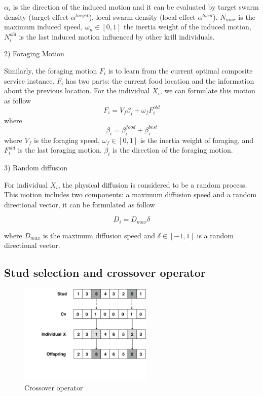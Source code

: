 \documentclass[10pt,journal,compsoc]{IEEEtran}
\begin{document}
$\alpha_i$ is the direction of the induced motion and it can be evaluated by target swarm density (target effect $\alpha^{target}$), local swarm density (local effect $\alpha^{local}$). $N_{max}$ is the maximum induced speed, $\omega_n \in [0, 1]$ the inertia weight of the induced motion, $N^{old}_{i}$ is the last induced motion influenced by other krill individuals.

2) Foraging Motion

Similarly, the foraging motion $F_i$ is to learn from the current optimal composite service instance. 
$F_i$ has two parts: the current food location and the information about the previous location. 
For the individual $X_i$, we can formulate this motion as follow
\begin{equation}
F_i = V_f\beta_i + \omega_f F^{old}_i
\end{equation}
where
\begin{equation}
\beta_i = \beta_i^{food}+\beta_i^{best}
\end{equation}
where $V_f$ is the foraging speed, $\omega_f \in [0, 1]$ is the inertia weight of foraging, and $F^{old}_i$ is the last foraging motion. $\beta_i$ is the direction of the foraging motion.

3) Random diffusion

For individual $X_i$, the physical diffusion is considered to be a random process. This motion includes two components: a maximum diffusion speed and a random directional vector, it can be formulated as follow

\begin{equation}
D_i = D_{max}\delta
\end{equation}

where $D_{max}$ is the maximum diffusion speed and $\delta \in [-1, 1]$ is a random directional vector.

\subsection{Stud selection and crossover operator}

\begin{figure}[!t]
\centering
\includegraphics[width=2.5in]{./img/pic5.pdf}
\caption{Crossover operator}
\label{fig_opportunistic}
\end{figure}
\end{document}
